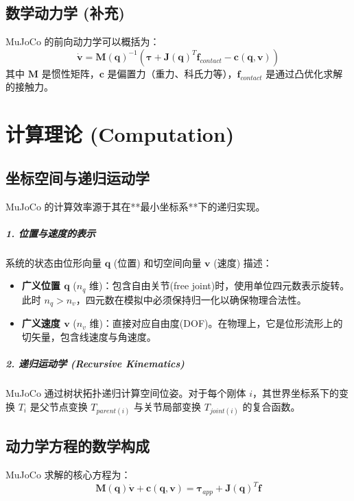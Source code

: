 \documentclass[11pt,a4paper]{book}
\begin{document}
\section{数学动力学 (补充)}
MuJoCo 的前向动力学可以概括为：
\begin{equation}
\dot{\bm{v}} = \bm{M}(\bm{q})^{-1} \left( \bm{\tau} + \bm{J}(\bm{q})^T \bm{f}_{contact} - \bm{c}(\bm{q}, \bm{v}) \right)
\end{equation}
其中 $\bm{M}$ 是惯性矩阵，$\bm{c}$ 是偏置力（重力、科氏力等），$\bm{f}_{contact}$ 是通过凸优化求解的接触力。



\chapter{计算理论 (Computation)}

\section{坐标空间与递归运动学}
MuJoCo 的计算效率源于其在**最小坐标系**下的递归实现。

\paragraph{1. 位置与速度的表示} 
系统的状态由位形向量 $\bm{q}$ (位置) 和切空间向量 $\bm{v}$ (速度) 描述：
\begin{itemize}
    \item \textbf{广义位置 $\bm{q}$} ($n_q$ 维)：包含自由关节(free joint)时，使用单位四元数表示旋转。此时 $n_q > n_v$，四元数在模拟中必须保持归一化以确保物理合法性。
    \item \textbf{广义速度 $\bm{v}$} ($n_v$ 维)：直接对应自由度(DOF)。在物理上，它是位形流形上的切矢量，包含线速度与角速度。
\end{itemize}

\paragraph{2. 递归运动学 (Recursive Kinematics)} 
MuJoCo 通过树状拓扑递归计算空间位姿。对于每个刚体 $i$，其世界坐标系下的变换 $T_i$ 是父节点变换 $T_{parent(i)}$ 与关节局部变换 $T_{joint(i)}$ 的复合函数。

\section{动力学方程的数学构成}
MuJoCo 求解的核心方程为：
\begin{equation}
\bm{M}(\bm{q})\dot{\bm{v}} + \bm{c}(\bm{q}, \bm{v}) = \bm{\tau}_{app} + \bm{J}(\bm{q})^T \bm{f}
\end{equation}
\end{document}
